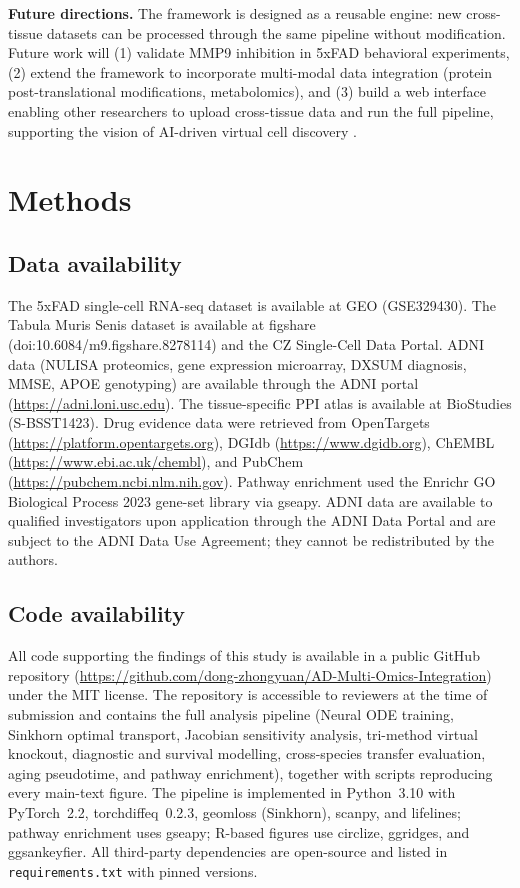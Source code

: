 \documentclass[12pt,a4paper]{article}
\begin{document}
\textbf{Future directions.}
The framework is designed as a reusable engine: new cross-tissue datasets can be processed through the same pipeline without modification. Future work will (1) validate MMP9 inhibition in 5xFAD behavioral experiments, (2) extend the framework to incorporate multi-modal data integration (protein post-translational modifications, metabolomics), and (3) build a web interface enabling other researchers to upload cross-tissue data and run the full pipeline, supporting the vision of AI-driven virtual cell discovery \citep{bunne2024}.

\section*{Methods}

\subsection*{Data availability}
The 5xFAD single-cell RNA-seq dataset is available at GEO (GSE329430). The Tabula Muris Senis dataset is available at figshare (doi:10.6084/m9.figshare.8278114) and the CZ Single-Cell Data Portal. ADNI data (NULISA proteomics, gene expression microarray, DXSUM diagnosis, MMSE, APOE genotyping) are available through the ADNI portal (\url{https://adni.loni.usc.edu}). The tissue-specific PPI atlas is available at BioStudies (S-BSST1423). Drug evidence data were retrieved from OpenTargets (\url{https://platform.opentargets.org}), DGIdb (\url{https://www.dgidb.org}), ChEMBL (\url{https://www.ebi.ac.uk/chembl}), and PubChem (\url{https://pubchem.ncbi.nlm.nih.gov}). Pathway enrichment used the Enrichr GO Biological Process 2023 gene-set library via gseapy. ADNI data are available to qualified investigators upon application through the ADNI Data Portal and are subject to the ADNI Data Use Agreement; they cannot be redistributed by the authors.

\subsection*{Code availability}
All code supporting the findings of this study is available in a public GitHub repository (\url{https://github.com/dong-zhongyuan/AD-Multi-Omics-Integration}) under the MIT license. The repository is accessible to reviewers at the time of submission and contains the full analysis pipeline (Neural ODE training, Sinkhorn optimal transport, Jacobian sensitivity analysis, tri-method virtual knockout, diagnostic and survival modelling, cross-species transfer evaluation, aging pseudotime, and pathway enrichment), together with scripts reproducing every main-text figure. The pipeline is implemented in Python~3.10 with PyTorch~2.2, torchdiffeq~0.2.3, geomloss (Sinkhorn), scanpy, and lifelines; pathway enrichment uses gseapy; R-based figures use circlize, ggridges, and ggsankeyfier. All third-party dependencies are open-source and listed in \texttt{requirements.txt} with pinned versions.
\end{document}
